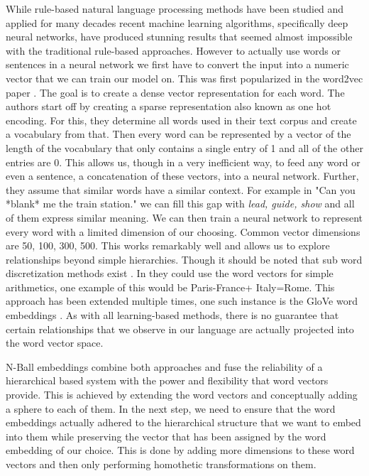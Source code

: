 \par
While rule-based natural language processing methods have been studied and applied for many decades recent machine learning algorithms, specifically deep neural networks, have produced stunning results that seemed almost impossible with the traditional rule-based approaches. However to actually use words or sentences in a neural network we first have to convert the input into a numeric vector that we can train our model on. This was first popularized in the word2vec paper \cite{mikolov2013efficient}. The goal is to create a dense vector representation for each word. The authors start off by creating a sparse representation also known as one hot encoding. For this, they determine all words used in their text corpus and create a vocabulary from that. Then every word can be represented by a vector of the length of the vocabulary that only contains a single entry of 1 and all of the other entries are 0. This allows us, though in a very inefficient way, to feed any word or even a sentence, a concatenation of these vectors, into a neural network. Further, they assume that similar words have a similar context. For example in "Can you *blank* me the train station." we can fill this gap with \textit{lead, guide, show} and all of them express similar meaning. We can then train a neural network to represent every word with a limited dimension of our choosing. Common vector dimensions are 50, 100, 300, 500. This works remarkably well and allows us to explore relationships beyond simple hierarchies. Though it should be noted that sub word discretization methods exist \cite{DBLP:journals/corr/abs-1801-06146}. In  \cite{mikolov2013efficient} they could use the word vectors for simple arithmetics, one example of this would be Paris-France+ Italy=Rome. This approach has been extended multiple times, one such instance is the GloVe word embeddings \cite{pennington-etal-2014-glove}. As with all learning-based methods, there is no guarantee that certain relationships that we observe in our language are actually projected into the word vector space. 



N-Ball embeddings combine both approaches and fuse the reliability of a hierarchical based system with the power and flexibility that word vectors provide. This is achieved by extending the word vectors and conceptually adding a sphere to each of them. In the next step, we need to ensure that the word embeddings actually adhered to the hierarchical structure that we want to embed into them while preserving the vector that has been assigned by the word embedding of our choice. This is done by adding more dimensions to these word vectors and then only performing homothetic transformations on them.
